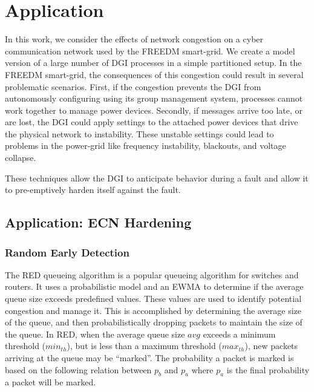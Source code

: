 


\chapter{Application}

In this work, we consider the effects of network congestion on a cyber communication network used by the \ac{FREEDM} smart-grid.
We create a model version of a large number of \ac{DGI} processes in a simple partitioned setup.
In  the \ac{FREEDM} smart-grid, the consequences of this congestion could result in several problematic scenarios.
First, if the congestion prevents the \ac{DGI} from autonomously configuring using its group management system, processes cannot work together to manage power devices.
Secondly, if messages arrive too late, or are lost, the \ac{DGI} could apply settings to the attached power devices that drive the physical network to instability.
These unstable settings could lead to problems in the power-grid like frequency instability, blackouts, and voltage collapse.



These techniques allow the DGI to anticipate behavior during a fault and allow it to pre-emptively harden itself against the fault.

\section{Application: ECN Hardening}


\subsection{Random Early Detection}
The \ac{RED} queueing algorithm is a popular queueing algorithm for switches and routers.
It uses a probabilistic model and an \ac{EWMA} to determine if the average queue size exceeds predefined values.
These values are used to identify potential congestion and manage it.
This is accomplished by determining the average size of the queue, and then probabilistically dropping packets to maintain the size of the queue.
In \ac{RED}, when the average queue size $avg$ exceeds a minimum threshold ($min_{th}$), but is less than a maximum threshold ($max_{th}$), new packets arriving at the queue may be ``marked''.
The probability a packet is marked is based on the following relation between $p_{b}$ and $p_{a}$ where $p_{a}$ is the final probability a packet will be marked.

